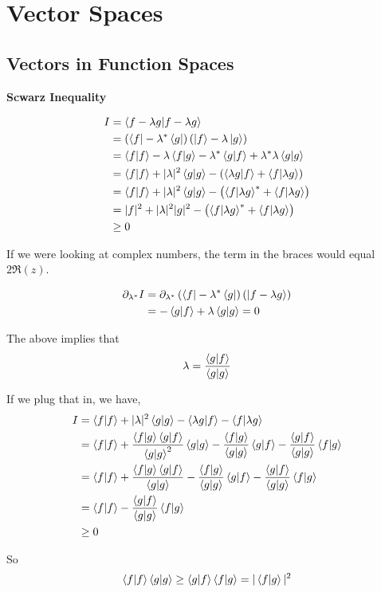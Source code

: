 \section{Vector Spaces}

\subsection{Vectors in Function Spaces}


\textbf{Scwarz Inequality}


\begin{align*}
I &= \braket{f - \lambda g | f - \lambda g} \\
&= \left( \bra{f} - \lambda^* \bra{g} \right) \left( \ket{f} - \lambda \ket{g} \right) \\
&= \braket{f|f} - \lambda \braket{f|g} - \lambda^* \braket{g|f} + \lambda^* \lambda \braket{g|g} \\
&= \braket{f|f} + |\lambda|^2 \braket{g|g} - \left( \braket{\lambda g|f} + \braket{f | \lambda g} \right) \\
&= \braket{f|f} + |\lambda|^2 \braket{g|g} - \left( \braket{f | \lambda g}^* + \braket{f | \lambda g} \right) \\
&= |f|^2 + |\lambda|^2 |g|^2 - \left( \braket{f | \lambda g}^* + \braket{f | \lambda g} \right) \\
& \geq 0
\end{align*}

If we were looking at complex numbers, the term in the braces would equal $2\Re(z)$.

\begin{align*}
\partial_{\lambda^*} I &= \partial_{\lambda^*} \left( \bra{f} -\lambda^*\bra{g} \right)\left(\ket{f - \lambda g}\right) \\
&= - \braket{g|f} + \lambda \braket{g|g} = 0
\end{align*}

The above implies that
$$
\lambda = \frac{\braket{g|f}}{\braket{g|g}}
$$

If we plug that in, we have,
\begin{align*}
I &= \braket{f|f} + |\lambda|^2 \braket{g|g} - \braket{\lambda g|f} - \braket{f | \lambda g} \\
&= \braket{f|f} + \frac{\braket{f|g}\braket{g|f}}{\braket{g|g}^2} \braket{g|g}
    - \frac{\braket{f|g}}{\braket{g|g}} \braket{g|f}
    - \frac{\braket{g|f}}{\braket{g|g}} \braket{f | g} \\
&= \braket{f|f} + \frac{\braket{f|g}\braket{g|f}}{\braket{g|g}}
    - \frac{\braket{f|g}}{\braket{g|g}} \braket{g|f}
    - \frac{\braket{g|f}}{\braket{g|g}} \braket{f | g} \\
&= \braket{f|f}
    - \frac{\braket{g|f}}{\braket{g|g}} \braket{f | g} \\
&\geq 0
\end{align*}

So
$$
\braket{f|f} \braket{g|g} \geq \braket{g|f} \braket{f|g} = |\braket{f|g}|^2
$$